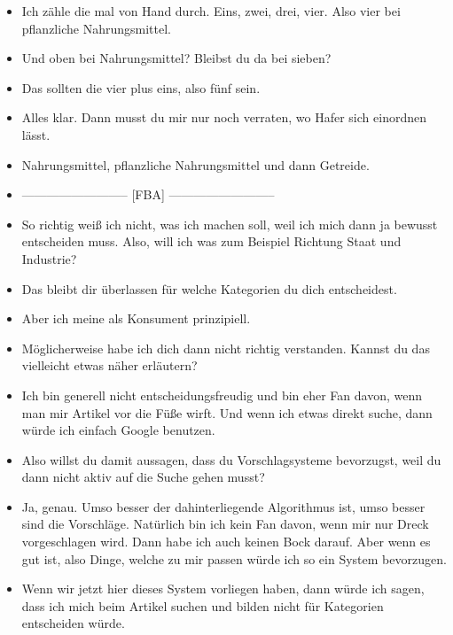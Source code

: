 {\begin{itemize}[]
              Und oben wären das sieben.
              Obwohl, warte mal.
              Dann wäre der Rindfleischburger doppelt gezählt.
              Und ich glaube, dass das mit den fünf auch nicht ganz passt.
        \item {} Ich zähle die mal von Hand durch. Eins, zwei, drei, vier. Also vier bei pflanzliche Nahrungsmittel.
        \item {} Und oben bei Nahrungsmittel? Bleibst du da bei sieben?
        \item {} Das sollten die vier plus eins, also fünf sein.
        \item {} Alles klar. Dann musst du mir nur noch verraten, wo Hafer sich einordnen lässt.
        \item {} Nahrungsmittel, pflanzliche Nahrungsmittel und dann Getreide.
        \item {--------------------------} [FBA] {--------------------------}
        \item {} So richtig weiß ich nicht, was ich machen soll, weil ich mich dann ja bewusst entscheiden muss.
              Also, will ich was zum Beispiel Richtung Staat und Industrie?
        \item {} Das bleibt dir überlassen für welche Kategorien du dich entscheidest.
        \item {} Aber ich meine als Konsument prinzipiell.
        \item {} Möglicherweise habe ich dich dann nicht richtig verstanden. Kannst du das vielleicht etwas näher erläutern?
        \item {} Ich bin generell nicht entscheidungsfreudig und bin eher Fan davon, wenn man mir Artikel vor die Füße wirft.
              Und wenn ich etwas direkt suche, dann würde ich einfach Google benutzen.
        \item {} Also willst du damit aussagen, dass du Vorschlagsysteme bevorzugst, weil du dann nicht aktiv auf die Suche gehen musst?
        \item {} Ja, genau.
              Umso besser der dahinterliegende Algorithmus ist, umso besser sind die Vorschläge.
              Natürlich bin ich kein Fan davon, wenn mir nur Dreck vorgeschlagen wird.
              Dann habe ich auch keinen Bock darauf.
              Aber wenn es gut ist, also Dinge, welche zu mir passen würde ich so ein System bevorzugen.
        \item {} Wenn wir jetzt hier dieses System vorliegen haben, dann würde ich sagen, dass ich mich beim Artikel suchen und bilden nicht für Kategorien entscheiden würde.

\end{itemize}}
